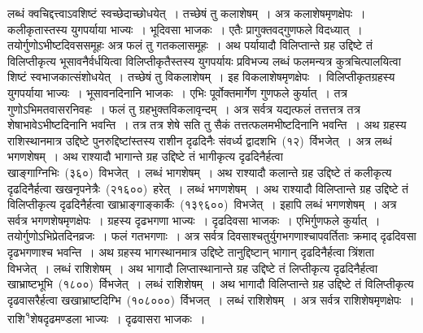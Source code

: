 \documentclass[11pt, openany]{book}
\begin{document}
\newpage
\thispagestyle{fancy}
\fancyhf{}
\noindent
लब्धं क्वचिद्दत्त्वाऽवशिष्टं स्वच्छेदाच्छोधयेत्~। तच्छेषं तु कलाशेषम्~। अत्र कलाशेषमृणक्षेपः~। कलीकृतास्तस्य युगपर्याया भाज्यः~। भूदिवसा भाजकः~। एतैः प्रागुक्तवद्गुणफले विदध्यात्~। तयोर्गुणोऽभीष्टदिवससमूहः अत्र फलं तु गतकलासमूहः~। अथ पर्यायादौ विलिप्तान्ते ग्रह उद्दिष्टे तं विलिप्तीकृत्य भूसावनैर्वर्धयित्वा विलिप्तीकृतैस्तस्य युगपर्यायः प्रविभज्य लब्धं फलमन्यत्र कुत्रचित्पालयित्वा शिष्टं स्वभाजकात्संशोधयेत्~। तच्छेषं तु विकलाशेषम्~। इह विकलाशेषमृणक्षेपः~। विलिप्तीकृतग्रहस्य युगपर्याया भाज्यः~। भूसावनदिनानि भाजकः~। एभिः पूर्वोक्तमार्गेण गुणफले कुर्यात्~। तत्र गुणोऽभिमतवासरनिवहः~। फलं तु ग्रहभुक्तविकलावृन्दम्~। अत्र सर्वत्र यद्यत्फलं तत्तत्तत्र तत्र शेषाभावेऽभीष्टदिनानि भवन्ति~। तत्र तत्र शेषे सति तु सैकं तत्तत्फलमभीष्टदिनानि भवन्ति~। अथ ग्रहस्य राशिस्थानमात्र उद्दिष्टे पुनरुद्दिष्टांस्तस्य राशीन दृढदिनैः संवर्ध्य द्वादशभि~(१२)~र्विभजेत्~। अत्र लब्धं भगणशेषम्~। अथ राश्यादौ भागान्ते ग्रह उद्दिष्टे तं भागीकृत्य दृढदिनैर्हत्वा खाङ्गाग्निभिः~(३६०)~विभजेत्~। लब्धं भागशेषम्~। अथ राश्यादौ कलान्ते ग्रह उद्दिष्टे तं कलीकृत्य दृढदिनैर्हत्वा खखनृपनेत्रैः~(२१६००)~हरेत्~। लब्धं भगणशेषम्~। अथ राश्यादौ विलिप्तान्ते ग्रह उद्दिष्टे तं विलिप्तीकृत्य दृढदिनैर्हत्वा खाभ्राङ्गाङ्कार्कैः~(१३९६००)~विभजेत्~। इहापि लब्धं भगणशेषम्~। अत्र सर्वत्र भगणशेषमृणक्षेपः~। ग्रहस्य दृढभगणा भाज्यः~। दृढदिवसा भाजकः~। एभिर्गुणफले कुर्यात्~। तयोर्गुणोऽभिप्रेतदिनव्रजः~। फलं गतभगणाः~। अत्र सर्वत्र दिवसाश्चतुर्युगभगणाश्चापवर्तिताः क्रमाद् दृढदिवसा दृढभगणाश्च भवन्ति~। अथ ग्रहस्य भागस्थानमात्र उद्दिष्टे तानुद्दिष्टान् भागान् दृढदिनैर्हत्वा त्रिंशता विभजेत्~। लब्धं राशिशेषम्~। अथ भागादौ लिप्तास्थानान्ते ग्रह उद्दिष्टे तं लिप्तीकृत्य दृढदिनैर्हत्वा खाभ्राष्टभूभि~(१८००)~र्विभजेत्~। लब्धं राशिशेषम्~। अथ भागादौ विलिप्तान्ते ग्रह उद्दिष्टे तं विलिप्तीकृत्य दृढवासरैर्हत्वा खखाभ्राष्टदिग्भि~(१०८०००)~र्विभजत्~। लब्धं राशिशेषम्~। अत्र सर्वत्र राशिशेषमृणक्षेपः~। राशि\textsuperscript{१}शेषदृढमण्डला भाज्यः~। दृढवासरा भाजकः~।

\end{document}
